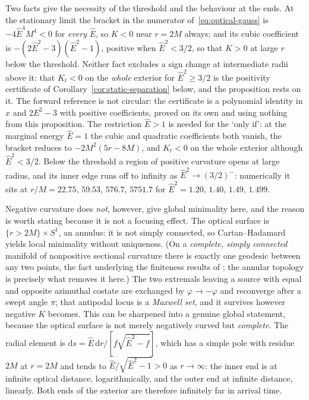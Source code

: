 \documentclass[12pt]{iopart}
\theoremstyle{plain}
\theoremstyle{definition}
\theoremstyle{remark}
\newcommand{\Ehat}{\hat E}
\newcommand{\dd}{\mathrm{d}}
\begin{document}
Two facts give the necessity of the threshold and the behaviour at the ends. At the
stationary limit the bracket in the numerator of~\eqref{eq:optical-gauss} is
$-4\Ehat^4M^4<0$ for \emph{every} $\Ehat$, so $K<0$ near $r=2M$ always; and its cubic
coefficient is $-(2\Ehat^2-3)(\Ehat^2-1)$, positive when $\Ehat^2<3/2$, so that $K>0$ at
large $r$ below the threshold. Neither fact excludes a sign change at intermediate radii
above it: that $K_t<0$ on the \emph{whole} exterior for $\Ehat^2\ge3/2$ is the
positivity certificate of Corollary~\ref{cor:static-separation} below, and the
proposition rests on it. The forward reference is not circular: the certificate is a
polynomial identity in $x$ and $2E^2-3$ with positive coefficients, proved on its own
and using nothing from this proposition. The restriction $\Ehat>1$ is needed for the `only if': at the
marginal energy $\Ehat=1$ the cubic and quadratic coefficients both vanish, the bracket
reduces to $-2M^2(5r-8M)$, and $K_t<0$ on the whole exterior although $\Ehat^2<3/2$. Below the
threshold a region of positive curvature opens at large radius, and its inner
edge runs off to infinity as $\Ehat^2\to(3/2)^-$: numerically it sits at
$r/M=22.75,\,59.53,\,576.7,\,5751.7$ for $\Ehat^2=1.20,\,1.40,\,1.49,\,1.499$.

Negative curvature does \emph{not}, however, give global minimality here, and the
reason is worth stating because it is not a focusing effect. The optical surface
is $\{r>2M\}\times S^1$, an annulus: it is not simply connected, so
Cartan--Hadamard yields local minimality without uniqueness. (On a \emph{complete, simply
connected} manifold of nonpositive sectional curvature there is exactly one
geodesic between any two points, the fact underlying the finiteness results of
\cite{GiannoniMasielloPiccione2001}; the annular topology is precisely what
removes it here.) The two extremals
leaving a source with equal and opposite azimuthal costate are exchanged by
$\varphi\to-\varphi$ and reconverge after a swept angle $\pi$; that antipodal
locus is a \emph{Maxwell set}, and it survives however negative $K$ becomes.
This can be sharpened into a genuine global statement, because the optical surface
is not merely negatively curved but \emph{complete}. The radial element is
$\dd s=\Ehat\,\dd r/[f\sqrt{\Ehat^2-f}]$, which has a simple pole with residue
$2M$ at $r=2M$ and tends to $\Ehat/\sqrt{\Ehat^2-1}>0$ as $r\to\infty$: the inner
end is at infinite optical distance, logarithmically, and the outer end at
infinite distance, linearly. Both ends of the exterior are therefore infinitely
far in arrival time.
\end{document}
